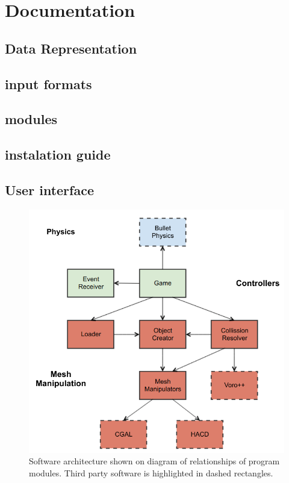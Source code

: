 \chapter{Documentation}

\section{Data Representation}

\section{input formats}

\section{modules}

\section{instalation guide}

\section{User interface}

\begin{figure}
        \centering
        \includegraphics[width=\textwidth]{img/objectmodel}
        \caption{Software architecture shown on diagram of relationships of program modules. Third party software is highlighted in dashed rectangles.}
        \label{fig:modules}
\end{figure}